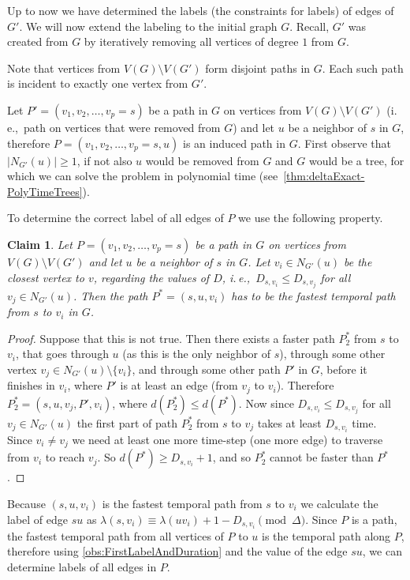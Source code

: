 \documentclass[11pt,a4paper]{article}
\newtheorem{claim}[theorem]{Claim}
\theoremstyle{remark}
\theoremstyle{definition}
\newcommand{\ie}{i.\,e.,\ }
\begin{document}
Up to now we have determined the labels (the constraints for labels) of edges of $G'$. We will now extend the labeling to the initial graph $G$. 
Recall, $G'$ was created from $G$ by iteratively removing all vertices of degree $1$ from $G$.

Note that vertices from $V(G) \setminus V(G')$ form disjoint paths in $G$. 
Each such path is incident to exactly one vertex from $G'$.
 
Let $P' = (v_1, v_2, \dots, v_p=s)$ be a path in $G$ on vertices from $V(G) \setminus V(G')$  (\ie path on vertices that were removed from $G$)
and let $u$ be a neighbor of $s$ in $G$,
therefore $P=(v_1, v_2, \dots, v_p=s, u)$ is an induced path in $G$.
First observe that $|N_{G'}(u)|\geq 1$, if not also $u$ would be removed from $G$ and $G$ would be a tree, for which we can solve the problem in polynomial time (see~\cref{thm:deltaExact-PolyTimeTrees}).

To determine the correct label of all edges of $P$ we use the following property.
\begin{claim}
Let $P = (v_1, v_2, \dots, v_p=s)$ be a path in $G$ on vertices from $V(G) \setminus V(G')$
and let $u$ be a neighbor of $s$ in $G$.
Let $v_i \in N_{G'}(u)$ be the closest vertex to $v$, regarding the values of $D$, \ie  $D_{s,v_i} \leq D_{s,v_j}$ for all $v_j \in N_{G'}(u)$.
Then the path $P^*=(s,u,v_i)$ has to be the fastest temporal path from $s$ to $v_i$ in $G$.
\end{claim}
\begin{proof}
Suppose that this is not true.
Then there exists a faster path $P^*_2$ from $s$ to $v_i$, that goes through $u$ (as this is the only neighbor of $s$), through some other vertex $v_j \in N_{G'}(u) \setminus \{v_i \}$, 
and through some other path $P'$ in $G$, before it finishes in $v_i$, where $P'$ is at least an edge (from $v_j$ to $v_i$). 
Therefore $P^*_2= (s,u,v_j,P',v_i)$, where $d(P^*_2) \leq d(P^*)$.
Now since $D_{s,v_i} \leq D_{s,v_j}$ for all $v_j \in N_{G'}(u)$ the first part of path $P^*_2$ from $s$ to $v_j$ takes at least $D_{s,v_i}$ time.
Since $v_i \neq v_j$ we need at least one more time-step (one more edge) to traverse from $v_i$ to reach $v_j$. 
So $d(P^*) \geq D_{s,v_i} + 1$, and so $P^*_2$ cannot be faster than $P^*$.
\end{proof}

Because $(s,u,v_i)$ is the fastest temporal path from $s$ to $v_i$ we calculate the label of edge $su$ as $\lambda (s,v_i) \equiv \lambda(u v_i) + 1 - D_{s,v_i} \pmod \Delta$.
Since $P$ is a path, the fastest temporal path from all vertices of $P$ to $u$ is the temporal path along $P$, therefore using \cref{obs:FirstLabelAndDuration} and the value of the edge $su$, we can determine labels of all edges in $P$.
\end{document}
